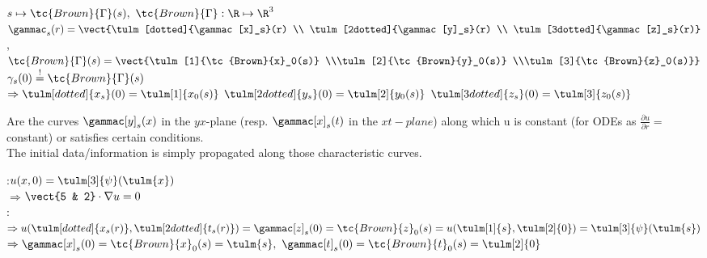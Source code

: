 \begin{defnbox}
    \begin{defn}
        $s\mapsto\tc{Brown}{\Gamma}(s),\ \tc{Brown}{\Gamma}:\R\mapsto\R^3$\\
        $\gammac_s(r)=\vect{\tulm[dotted]{\gammac[x]_s}(r) \\ \tulm[2dotted]{\gammac[y]_s}(r) \\ \tulm[3dotted]{\gammac[z]_s}(r)}$,\quad
        $\tc{Brown}{\Gamma}(s)=\vect{\tulm[1]{\tc{Brown}{x}_0(s)} \\\tulm[2]{\tc{Brown}{y}_0(s)} \\\tulm[3]{\tc{Brown}{z}_0(s)}}$\hfill
        $\gamma_s(0)\stackrel{!}{=}\tc{Brown}{\Gamma}(s)$\\
        $\Rightarrow \tulm[dotted]{x_s}(0)=\tulm[1]{x_0(s)}$\hfil
        $\tulm[2dotted]{y_s}(0)=\tulm[2]{y_0(s)}$\hfil
        $\tulm[3dotted]{z_s}(0)=\tulm[3]{z_0(s)}$
    \end{defn}
\end{defnbox}
\begin{defnbox}
    \begin{defn}
        Are the curves $\gammac[y]_s(x)$ in the $yx$-plane (resp. $\gammac[x]_s(t)$ in the $xt-plane$) along which u is constant
        (for ODEs as $\frac{\partial u}{\partial r}=$constant) or satisfies certain conditions.\\
        The initial data/information is simply propagated along those characteristic curves.
    \end{defn}
\end{defnbox}
\begin{notebox}[Example 2: \textnormal{$5u_t+2u_x=0$\hfil $\dot{t}=5,\ \dot{x}=2t,\ \dot{z}=0$}]
                :\hfil $u(x, 0)=\tulm[3]{\psi}(\tulm{x})$\\
                $\Rightarrow$\hfil $\vect{5 & 2}\cdot\nabla u=0$\\
                :\\
                $\Rightarrow u(\tulm[dotted]{x_s(r)},\tulm[2dotted]{t_s(r)})=\gammac[z]_s(0)=\tc{Brown}{z}_0(s)=u(\tulm[1]{s},\tulm[2]{0})=\tulm[3]{\psi}(\tulm{s})$\\
                $\Rightarrow \gammac[x]_s(0)=\tc{Brown}{x}_0(s)=\tulm{s},\
                             \gammac[t]_s(0)=\tc{Brown}{t}_0(s)=\tulm[2]{0}$
\end{notebox}
